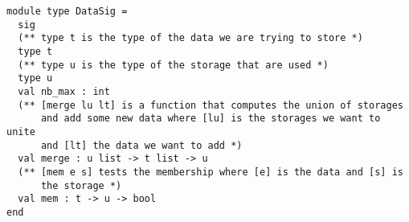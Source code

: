 \begin{lstlisting}
module type DataSig =
  sig
  (** type t is the type of the data we are trying to store *)
  type t
  (** type u is the type of the storage that are used *)
  type u
  val nb_max : int
  (** [merge lu lt] is a function that computes the union of storages
      and add some new data where [lu] is the storages we want to unite
      and [lt] the data we want to add *)
  val merge : u list -> t list -> u
  (** [mem e s] tests the membership where [e] is the data and [s] is
      the storage *)
  val mem : t -> u -> bool
end
\end{lstlisting}